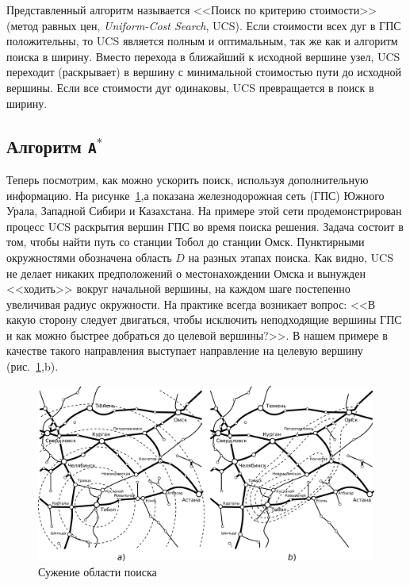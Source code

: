\documentclass[a4paper,14pt, openany, twoside, final]{extbook} %
\newcommand{\eeng}[1]{\emph{\foreignlanguage{english}{#1}}}
\begin{document}
Представленный алгоритм называется <<Поиск по критерию стоимости>> (метод равных цен, \eeng{Uniform-Cost Search}, UCS).  Если стоимости всех дуг в ГПС положительны, то UCS является полным и оптимальным, так же как и алгоритм поиска в ширину.  Вместо перехода в ближайший к исходной вершине узел, UCS переходит (раскрывает) в вершину с минимальной стоимостью пути до исходной вершины.  Если все стоимости дуг одинаковы, UCS превращается в поиск в ширину.

\subsection{Алгоритм \texttt{A}${}^\mathtt{*}$}

Теперь посмотрим, как можно ускорить поиск, используя дополнительную информацию.  На рисунке~\ref{fig:contraction},а показана железнодорожная сеть (ГПС) Южного Урала, Западной Сибири и Казахстана.  На примере этой сети продемонстрирован процесс UCS раскрытия вершин ГПС во время поиска решения.  Задача состоит в том, чтобы найти путь со станции Тобол до станции Омск.   Пунктирными окружностями обозначена область $D$ на разных этапах поиска.  Как видно, UCS не делает никаких предположений о местонахождении Омска и вынужден <<ходить>> вокруг начальной вершины, на каждом шаге постепенно увеличивая радиус окружности.  На практике всегда возникает вопрос: <<В какую сторону следует двигаться, чтобы исключить неподходящие вершины ГПС и как можно быстрее добраться до целевой вершины?>>.  В нашем примере в качестве такого направления выступает направление на целевую вершину (рис.~\ref{fig:contraction},b).
\begin{figure}[hbt]
  \centering
  \includegraphics[width=\columnwidth]{yuzd1.pdf}
  \caption{Сужение области поиска}\label{fig:contraction}
\end{figure}
\end{document}
